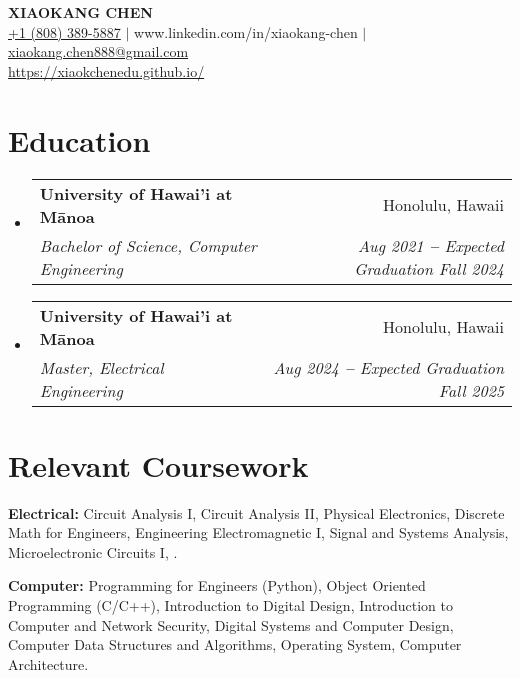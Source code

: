 \documentclass[letterpaper,11pt]{article}
\makeatletter
\newcommand{\resumeSubheading}[4]{
  \vspace{-2pt}\item
    \begin{tabular*}{0.97\textwidth}[t]{l@{\extracolsep{\fill}}r}
      \textbf{#1} & #2 \\
      \textit{\small#3} & \textit{\small #4} \\
    \end{tabular*}\vspace{-7pt}
}
\newcommand{\resumeSubHeadingListStart}{\begin{itemize}[leftmargin=0.15in, label={}]}
\newcommand{\resumeSubHeadingListEnd}{\end{itemize}}
\makeatother
\begin{document}

\begin{center}
    \textbf{\Huge \scshape XIAOKANG CHEN} \\ \vspace{3pt}
    \small
    \hspace{.5pt} \href{tel:18083895887}{+1 (808) 389-5887}\hspace{.5pt} $|$\hspace{.5pt} {www.linkedin.com/in/xiaokang-chen}\hspace{.5pt} $|$\hspace{.5pt} \href{mailto:xiaokang.chen888@gmail.com}{xiaokang.chen888@gmail.com} \\
    \hspace{.5pt} \href{https://xiaokchenedu.github.io/}{https://xiaokchenedu.github.io/} \\
\end{center}


\section{Education}
  \vspace{3pt}
  \resumeSubHeadingListStart
    
  \resumeSubheading
    {University of Hawai'i at Mānoa}{Honolulu, Hawaii}
    {Bachelor of Science, Computer Engineering}{Aug 2021 \textbf{--} Expected Graduation Fall 2024}
  \resumeSubheading
    {University of Hawai'i at Mānoa}{Honolulu, Hawaii}
    {Master, Electrical Engineering}{Aug 2024 \textbf{--} Expected Graduation Fall 2025}
  \resumeSubHeadingListEnd


\section{Relevant Coursework}
  \vspace{2pt}
  \resumeSubHeadingListStart
    \small{\item{
        \textbf{Electrical: }{Circuit Analysis I, Circuit Analysis II, Physical Electronics, Discrete Math for Engineers, Engineering Electromagnetic I, Signal and Systems Analysis, Microelectronic Circuits I, .} \\ \vspace{3pt}
        
        \textbf{Computer: }{Programming for Engineers (Python), Object Oriented Programming (C/C++), Introduction to Digital Design, Introduction to Computer and Network Security, Digital Systems and Computer Design, Computer Data Structures and Algorithms, Operating System, Computer Architecture.}
    }}
  \resumeSubHeadingListEnd
\end{document}
